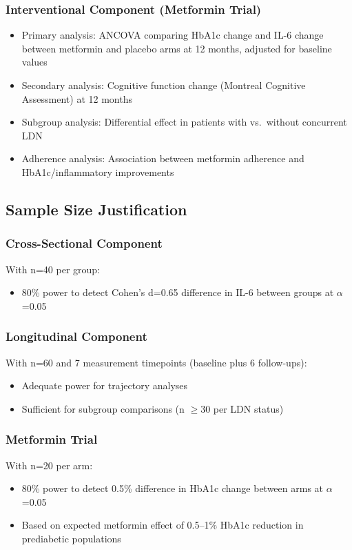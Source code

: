 \subsubsection{Interventional Component (Metformin Trial)}
\begin{itemize}
    \item Primary analysis: ANCOVA comparing HbA1c change and IL-6 change between metformin and placebo arms at 12 months, adjusted for baseline values
    \item Secondary analysis: Cognitive function change (Montreal Cognitive Assessment) at 12 months
    \item Subgroup analysis: Differential effect in patients with vs.\ without concurrent LDN
    \item Adherence analysis: Association between metformin adherence and HbA1c/inflammatory improvements
\end{itemize}

\subsection{Sample Size Justification}

\subsubsection{Cross-Sectional Component}
With n=40 per group:
\begin{itemize}
    \item 80\% power to detect Cohen's d=0.65 difference in IL-6 between groups at $\alpha$=0.05
\end{itemize}

\subsubsection{Longitudinal Component}
With n=60 and 7 measurement timepoints (baseline plus 6 follow-ups):
\begin{itemize}
    \item Adequate power for trajectory analyses
    \item Sufficient for subgroup comparisons (n $\geq$30 per LDN status)
\end{itemize}

\subsubsection{Metformin Trial}
With n=20 per arm:
\begin{itemize}
    \item 80\% power to detect 0.5\% difference in HbA1c change between arms at $\alpha$=0.05
    \item Based on expected metformin effect of 0.5--1\% HbA1c reduction in prediabetic populations
\end{itemize}

